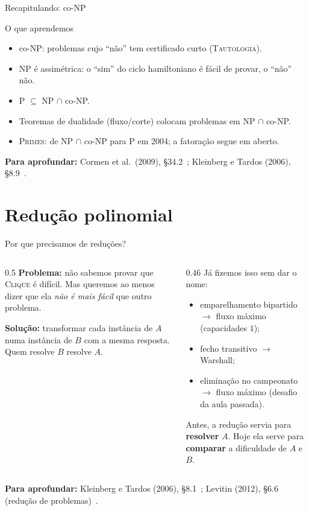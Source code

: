 \documentclass[aspectratio=169,xcolor=table]{beamer}
\newcommand{\fonte}[1]{%
  \vfill
  {\tiny\color{gray!55!black}\textbf{Para aprofundar:} #1\par}%
}
\newcommand{\prob}[1]{\textsc{#1}}
\begin{document}
\begin{frame}{Recapitulando: co-NP}
  \begin{block}{O que aprendemos}
    \begin{itemize}
      \item co-NP: problemas cujo ``não'' tem certificado curto (\prob{Tautologia}).
      \item NP é assimétrica: o ``sim'' do ciclo hamiltoniano é fácil de provar, o ``não'' não.
      \item P $\subseteq$ NP $\cap$ co-NP.
      \item Teoremas de dualidade (fluxo/corte) colocam problemas em NP $\cap$ co-NP.
      \item \prob{Primes}: de NP $\cap$ co-NP para P em 2004; a fatoração segue em aberto.
    \end{itemize}
  \end{block}
  \fonte{Cormen et al.\ (2009), \S 34.2~\cite{cormen2009introduction};
    Kleinberg e Tardos (2006), \S 8.9~\cite{kleinberg2006algorithm}.}
\end{frame}

\section{Redução polinomial}

\begin{frame}{Por que precisamos de reduções?}
  \begin{columns}[T]
    \begin{column}{0.5\textwidth}
      \textbf{Problema:} não sabemos provar que \prob{Clique} é difícil. Mas queremos ao
      menos dizer que ela \emph{não é mais fácil} que outro problema.
      \medskip

      \textbf{Solução:} transformar cada instância de $A$ numa instância de $B$ com a mesma
      resposta. Quem resolve $B$ resolve $A$.
    \end{column}
    \begin{column}{0.46\textwidth}
      \scriptsize
      Já fizemos isso sem dar o nome:
      \begin{itemize}
        \item emparelhamento bipartido $\to$ fluxo máximo (capacidades $1$);
        \item fecho transitivo $\to$ Warshall;
        \item eliminação no campeonato $\to$ fluxo máximo (desafio da aula passada).
      \end{itemize}
      \medskip
      Antes, a redução servia para \textbf{resolver} $A$. Hoje ela serve para
      \textbf{comparar} a dificuldade de $A$ e $B$.
    \end{column}
  \end{columns}
  \fonte{Kleinberg e Tardos (2006), \S 8.1~\cite{kleinberg2006algorithm};
    Levitin (2012), \S 6.6 (redução de problemas)~\cite{levitin2012introduction}.}
\end{frame}
\end{document}
